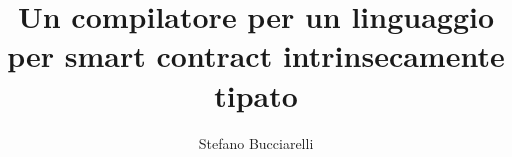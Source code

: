 \author{
    Stefano Bucciarelli
}
\title{Un compilatore per un linguaggio per smart contract intrinsecamente tipato}

